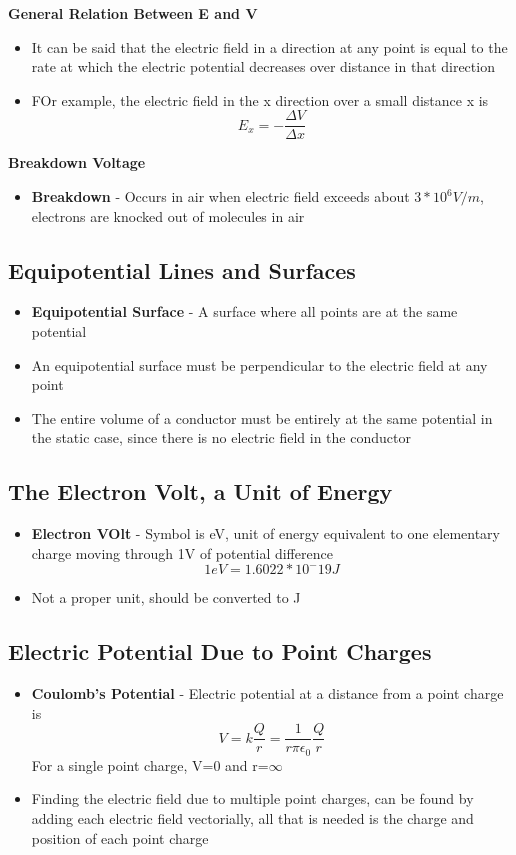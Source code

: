 \textbf{General Relation Between E and V}
\begin{itemize}
    \item It can be said that the electric field in a direction at any point is equal to the rate at which the electric potential decreases over distance in that direction
    \item FOr example, the electric field in the x direction over a small distance x is \[E_x=-\frac{\Delta V}{\Delta x}\]
\end{itemize}

\textbf{Breakdown Voltage}
\begin{itemize}
    \item \textbf{Breakdown} - Occurs in air when electric field exceeds about \(3*10^6V/m\), electrons are knocked out of molecules in air
\end{itemize}

\subsection{Equipotential Lines and Surfaces}
\begin{itemize}
    \item \textbf{Equipotential Surface} - A surface where all points are at the same potential
    \item An equipotential surface must be perpendicular to the electric field at any point
    \item The entire volume of a conductor must be entirely at the same potential in the static case, since there is no electric field in the conductor
\end{itemize}

\subsection{The Electron Volt, a Unit of Energy}
\begin{itemize}
    \item \textbf{Electron VOlt} - Symbol is eV, unit of energy equivalent to one elementary charge moving through 1V of potential difference \[1eV=1.6022*10^-19J\]
    \item Not a proper unit, should be converted to J
\end{itemize}

\subsection{Electric Potential Due to Point Charges}
\begin{itemize}
    \item \textbf{Coulomb's Potential} - Electric potential at a distance from a point charge is \[V=k\frac{Q}{r}=\frac{1}{r\pi\epsilon_0}\frac{Q}{r}\] 
    For a single point charge, V=0 and r=\(\infty\)
    \item Finding the electric field due to multiple point charges, can be found by adding each electric field vectorially, all that is needed is the charge and position of each point charge
\end{itemize}

